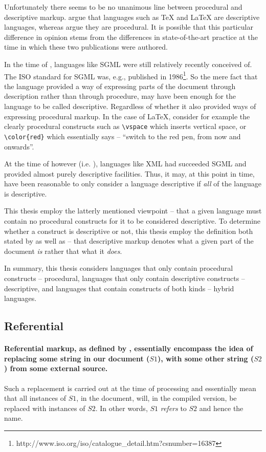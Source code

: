 \documentclass{scrreprt}
\begin{document}
Unfortunately there seems to be no unanimous line between procedural and descriptive markup. \citet{coombs} argue that languages such as \TeX{} and \LaTeX{} are descriptive languages, whereas \citet{bray} argue they are procedural. It is possible that this particular difference in opinion stems from the differences in state-of-the-art practice at the time in which these two publications were authored.

In the time of \citet{coombs}, languages like SGML were still relatively recently conceived of. The ISO standard for SGML was, e.g., published in 1986\footnote{http://www.iso.org/iso/catalogue\_detail.htm?csnumber=16387}. So the mere fact that the language provided a way of expressing parts of the document through description rather than through procedure, may have been enough for the language to be called descriptive. Regardless of whether it also provided ways of expressing procedural markup. In the case of \LaTeX{}, consider for example the clearly procedural constructs such as \texttt{\textbackslash vspace} which inserts vertical space, or  \texttt{\textbackslash color\{red\}} which essentially says -- ``switch to the red pen, from now and onwards''.

At the time of \citet{bray} however (i.e. \citeyear{bray}), languages like XML had succeeded SGML and provided almost purely descriptive facilities. Thus, it may, at this point in time, have been reasonable to only consider a language descriptive if \emph{all} of the language is descriptive.

This thesis employ the latterly mentioned viewpoint -- that a given language must contain no procedural constructs for it to be considered descriptive. To determine whether a construct is descriptive or not, this thesis employ the definition both stated by \citet{coombs} as well as \citet{bray} -- that descriptive markup denotes what a given part of the document \emph{is} rather that what it \emph{does}.

In summary, this thesis considers languages that only contain procedural constructs -- procedural, languages that only contain descriptive constructs -- descriptive, and languages that contain constructs of both kinds -- hybrid languages.  


\subsection{Referential}
\label{sec:referential-markup}
\paragraph{Referential markup, as defined by \citet{coombs}, essentially encompass the idea of replacing some string in our document ($S1$), with some other string ($S2$) from some external source.} Such a replacement is carried out at the time of processing and essentially mean that all instances of $S1$, in the document, will, in the compiled version, be replaced with instances of $S2$. In other words, $S1$ \emph{refers} to $S2$ and hence the name.
\end{document}
